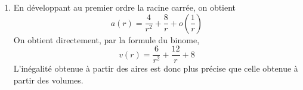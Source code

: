 \begin{enumerate}
 \item En développant au premier ordre la racine carrée, on obtient
\begin{displaymath}
 a(r)=\frac{4}{r^2} + \frac{8}{r} + o(\frac{1}{r})
\end{displaymath}
On obtient directement, par la formule du binome,
\begin{displaymath}
 v(r)=\frac{6}{r^2} + \frac{12}{r} + 8
\end{displaymath}
L'inégalité obtenue à partir des aires est donc plus précise que celle obtenue à partir des volumes.
\end{enumerate}
